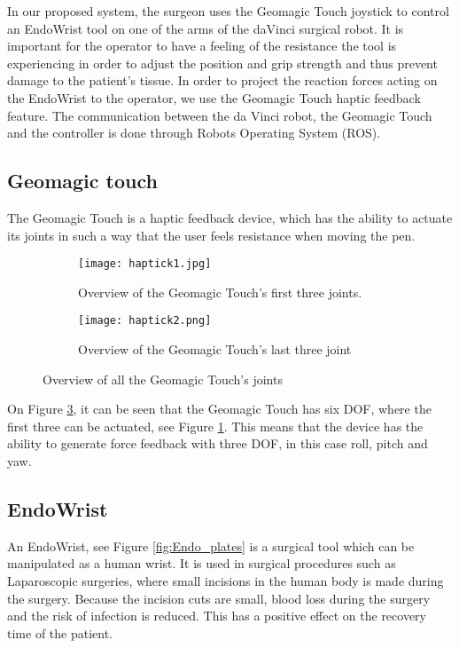 In our proposed system, the surgeon uses the Geomagic Touch joystick to control an EndoWrist tool on one of the arms of the daVinci surgical robot.
It is important for the operator to have a feeling of the resistance the tool is experiencing in order to adjust the position and grip strength and thus prevent damage to the patient's tissue.
In order to project the reaction forces acting on the EndoWrist to the operator, we use the Geomagic Touch haptic feedback feature. The communication between the da Vinci robot, the Geomagic Touch and the controller is done through Robots Operating System (ROS).



\subsection{Geomagic touch}\label{sec:Geomagic_touch}
The Geomagic Touch is a haptic feedback device, which has the ability to actuate its joints in such a way that the user feels resistance when moving the pen. 


\begin{figure}
  \centering
  \begin{subfigure}{.22\textwidth}
    \centering
    \texttt{[image: haptick1.jpg]}
    \caption{Overview of the Geomagic Touch's first three joints.}
    \label{fig:phantom1}
  \end{subfigure}
  \begin{subfigure}{.22\textwidth}
    \centering
    \texttt{[image: haptick2.png]}
    \caption{Overview of the Geomagic Touch's last three joint}
    \label{fig:phantom2}
  \end{subfigure}
\caption{Overview of all the Geomagic Touch's joints\cite{phantom_omni}}
\label{fig:phantom_omni}
\end{figure}


On Figure \ref{fig:phantom_omni}, it can be seen that the Geomagic Touch has six DOF, where the first three can be actuated, see Figure \ref{fig:phantom1}. This means that the device has the ability to generate force feedback with three DOF, in this case roll, pitch and yaw.



    
\subsection{EndoWrist}
An EndoWrist, see Figure \ref{fig:Endo_plates} is a surgical tool which can be manipulated as a human wrist.
It is used in surgical procedures such as Laparoscopic surgeries,  where small incisions in the human body is made during the surgery.
Because the incision cuts are small, blood loss during the surgery and the risk of infection is reduced. This has a positive effect on the recovery time of the patient\cite{RIGSP}.


